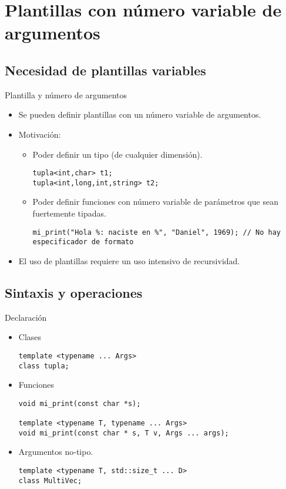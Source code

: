 \section{Plantillas con número variable de argumentos}

\subsection{Necesidad de plantillas variables}

\begin{frame}[fragile]{Plantilla y número de argumentos}
  \begin{itemize}
    \item Se pueden definir plantillas con un número variable de argumentos.
    \item Motivación:
      \begin{itemize}
        \item \pause Poder definir un tipo  (de cualquier dimensión).
\begin{lstlisting}
tupla<int,char> t1;
tupla<int,long,int,string> t2;
\end{lstlisting}
        \item \pause Poder definir funciones con número variable de parámetros que
        sean fuertemente tipadas.
\begin{lstlisting}
mi_print("Hola %: naciste en %", "Daniel", 1969); // No hay especificador de formato
\end{lstlisting}
      \end{itemize}
    \item \pause El uso de plantillas requiere un uso intensivo de recursividad.
  \end{itemize}
\end{frame}

\subsection{Sintaxis y operaciones}

\begin{frame}[fragile]{Declaración}
  \begin{itemize}
    \item Clases
\begin{lstlisting}
template <typename ... Args>
class tupla;
\end{lstlisting}
    \item \pause Funciones
\begin{lstlisting}
void mi_print(const char *s);

template <typename T, typename ... Args>
void mi_print(const char * s, T v, Args ... args);
\end{lstlisting}
    \item \pause Argumentos no-tipo.
\begin{lstlisting}
template <typename T, std::size_t ... D>
class MultiVec;
\end{lstlisting}
  \end{itemize}
\end{frame}

